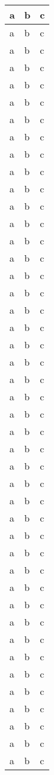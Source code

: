 \begin{longtable}{|X|X|X|}
\hline
a & b & c\\
\hline
a & b & c\\
\hline
a & b & c\\
\hline
a & b & c\\
\hline
a & b & c\\
\hline
a & b & c\\
\hline
a & b & c\\
\hline
a & b & c\\
\hline
a & b & c\\
\hline
a & b & c\\
\hline
a & b & c\\
\hline
a & b & c\\
\hline
a & b & c\\
\hline
a & b & c\\
\hline
a & b & c\\
\hline
a & b & c\\
\hline
a & b & c\\
\hline
a & b & c\\
\hline
a & b & c\\
\hline
a & b & c\\
\hline
a & b & c\\
\hline
a & b & c\\
\hline
a & b & c\\
\hline
a & b & c\\
\hline
a & b & c\\
\hline
a & b & c\\
\hline
a & b & c\\
\hline
a & b & c\\
\hline
a & b & c\\
\hline
a & b & c\\
\hline
a & b & c\\
\hline
a & b & c\\
\hline
a & b & c\\
\hline
a & b & c\\
\hline
a & b & c\\
\hline
a & b & c\\
\hline
a & b & c\\
\hline
a & b & c\\
\hline
a & b & c\\
\hline
a & b & c\\
\hline
a & b & c\\
\hline
a & b & c\\
\hline
a & b & c\\
\hline
a & b & c\\
\hline

\end{longtable}
